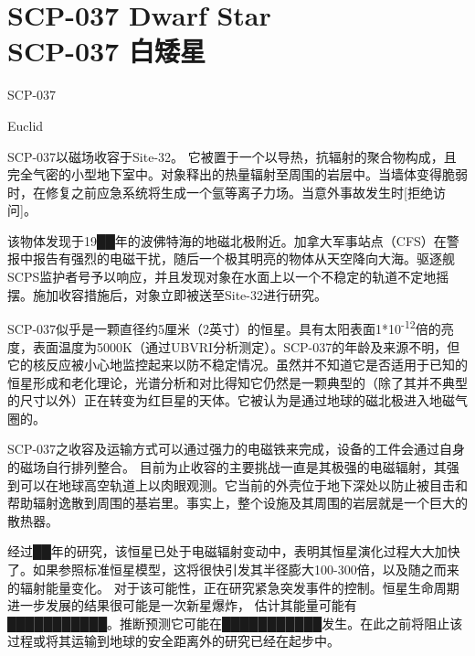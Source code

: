\chapter[SCP-037 白矮星]{
    SCP-037 Dwarf Star\\
    SCP-037 白矮星
}

\label{chap:SCP-037}

 SCP-037

 Euclid

 SCP-037以磁场收容于Site-32。 它被置于一个以导热，抗辐射的聚合物构成，且完全气密的小型地下室中。对象释出的热量辐射至周围的岩层中。当墙体变得脆弱时，在修复之前应急系统将生成一个氩等离子力场。当意外事故发生时{[}拒绝访问]。

 该物体发现于19██年的波佛特海的地磁北极附近。加拿大军事站点（CFS）在警报中报告有强烈的电磁干扰，随后一个极其明亮的物体从天空降向大海。驱逐舰SCPS监护者号予以响应，并且发现对象在水面上以一个不稳定的轨道不定地摇摆。施加收容措施后，对象立即被送至Site-32进行研究。

SCP-037似乎是一颗直径约5厘米（2英寸）的恒星。具有太阳表面1*10\textsuperscript{-12}倍的亮度，表面温度为5000K（通过UBVRI分析测定）。SCP-037的年龄及来源不明，但它的核反应被小心地监控起来以防不稳定情况。虽然并不知道它是否适用于已知的恒星形成和老化理论，光谱分析和对比得知它仍然是一颗典型的（除了其并不典型的尺寸以外）正在转变为红巨星的天体。它被认为是通过地球的磁北极进入地磁气圈的。

SCP-037之收容及运输方式可以通过强力的电磁铁来完成，设备的工件会通过自身的磁场自行排列整合。 目前为止收容的主要挑战一直是其极强的电磁辐射，其强到可以在地球高空轨道上以肉眼观测。它当前的外壳位于地下深处以防止被目击和帮助辐射逸散到周围的基岩里。事实上，整个设施及其周围的岩层就是一个巨大的散热器。

经过██年的研究，该恒星已处于电磁辐射变动中，表明其恒星演化过程大大加快了。如果参照标准恒星模型，这将很快引发其半径膨大100-300倍，以及随之而来的辐射能量变化。 对于该可能性，正在研究紧急突发事件的控制。恒星生命周期进一步发展的结果很可能是一次新星爆炸， 估计其能量可能有███████████。推断预测它可能在███████████发生。在此之前将阻止该过程或将其运输到地球的安全距离外的研究已经在起步中。

